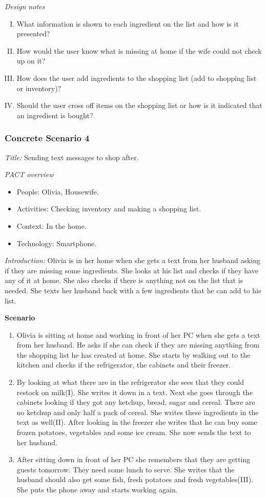 \emph{Design notes}

\begin{enumerate} [(I)]
\item What information is shown to each ingredient on the list and how is it presented?
\item How would the user know what is missing at home if the wife could not check up on it?
\item How does the user add ingredients to the shopping list (add to shopping list or inventory)?
\item Should the user cross off items on the shopping list or how is it indicated that an ingredient is bought? 
\end{enumerate}

\subsubsection{Concrete Scenario 4} \label{ConcreteScenario4}

\emph{Title:} Sending text messages to shop after.

\emph{PACT overview}
\begin{itemize}
\item People: Olivia, Housewife.  
\item Activities: Checking inventory and making a shopping list.
\item Context: In the home.
\item Technology: Smartphone.  
\end{itemize}

\emph{Introduction:} Olivia is in her home when she gets a text from her husband asking if they are missing some ingredients. She looks at his list and checks if they have any of it at home. She also checks if there is anything not on the list that is needed. She texts her husband back with a few ingredients that he can add to his list.

\textbf{Scenario}
\begin{enumerate}
\item Olivia is sitting at home and working in front of her PC when she gets a text from her husband. He asks if she can check if they are missing anything from the shopping list he has created at home. She starts by walking out to the kitchen and checks if the refrigerator, the cabinets and their freezer.
\item By looking at what there are in the refrigerator she sees that they could restock on milk(I). She writes it down in a text. Next she goes through the cabinets looking if they got any ketchup, bread, sugar and cereal. There are no ketchup and only half a pack of cereal. She writes these ingredients in the text as well(II). After looking in the freezer she writes that he can buy some frozen potatoes, vegetables and some ice cream. She now sends the text to her husband.  
\item After sitting down in front of her PC she remembers that they are getting guests tomorrow. They need some lunch to serve. She writes that the husband should also get some fish, fresh potatoes and fresh vegetables(III). She puts the phone away and starts working again. 
\end{enumerate}

